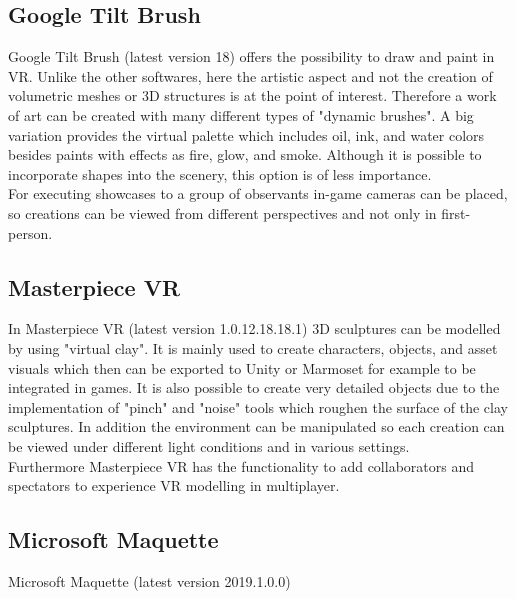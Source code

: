 \documentclass{report}
\begin{document}
		\subsection[Google Tilt Brush]{Google Tilt Brush \textsc{\small{\cite{GTB}}}}
		\startsubsection
			Google Tilt Brush (latest version 18) offers the possibility to draw and paint in VR. Unlike the other softwares, here the artistic aspect and not the creation of volumetric meshes or 3D structures is at the point of interest. Therefore a work of art can be created with many different types of "dynamic brushes". A big variation provides the virtual palette which includes oil, ink, and water colors besides paints with effects as fire, glow, and smoke. Although it is possible to incorporate shapes into the scenery, this option is of less importance. \\
			For executing showcases to a group of observants in-game cameras can be placed, so creations can be viewed from different perspectives and not only in first-person.
		\closesection
		\subsection[Masterpiece VR]{Masterpiece VR \textsc{\small{\cite{MVR}}}}
		\startsubsection
			In Masterpiece VR (latest version 1.0.12.18.18.1) 3D  sculptures can be modelled by using "virtual clay". It is mainly used to create characters, objects, and asset visuals which then can be exported to Unity or Marmoset for example to be integrated in games. It is also possible to create very detailed objects due to the implementation of "pinch" and "noise" tools which roughen the surface of the clay sculptures. In addition the environment can be manipulated so each creation can be viewed under different light conditions and in various settings. \\
			Furthermore Masterpiece VR has the functionality to add collaborators and spectators to experience VR modelling in multiplayer.
		\closesection
		\subsection[Microsoft Maquette]{Microsoft Maquette \textsc{\small{\cite{MSM}}}}
		\startsubsection
			Microsoft Maquette (latest version 2019.1.0.0)
		\closesection
	\closesection
			
\end{document}
